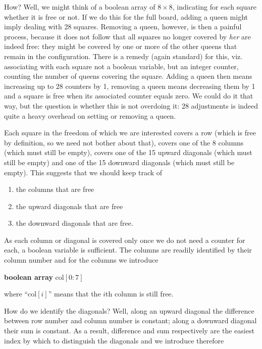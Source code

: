 \documentclass[twoside,11pt]{book}
\begin{document}
How? Well, we might think of a boolean array of $8\times 8$, indicating for each square whether it is free or not. If we do this for the full board, adding a queen might imply dealing with 28 squares. Removing a queen, however, is then a painful process, because it does not follow that all squares no longer covered by \textit{her} are indeed free: they might be covered by one or more of the other queens that remain in the configuration. There is a remedy (again standard) for this, viz. associating with each square not a boolean variable, but an integer counter, counting the number of queens covering the square. Adding a queen then means increasing up to 28 counters by 1, removing a queen means decreasing them by 1 and a square is free when its associated counter equals zero. We could do it that way, but the question is whether this is not overdoing it: 28 adjustments is indeed quite a heavy overhead on setting or removing a queen.

Each square in the freedom of which we are interested covers a row (which is free by definition, so we need not bother about that), covers one of the 8 columns (which must still be empty), covers one of the 15 upward diagonals (which must still be empty) and one of the 15 downward diagonals (which must still be empty). This suggests that we should keep track of

\begin{enumerate}[wide, nosep, label=(\arabic*)]
	\item the columns that are free
	\item the upward diagonals that are free
	\item the downward diagonals that are free.
\end{enumerate}

As each column or diagonal is covered only once we do not need a counter for each, a boolean variable is sufficient. The columns are readily identified by their column number and for the columns we introduce

\textbf{boolean array} col$[0:7]$

\noindent
where ``col$[i]$'' means that the $i$th column is still free.

How do we identify the diagonals? Well, along an upward diagonal the difference between row number and column number is constant; along a downward diagonal their sum is constant. As a result, difference and sum respectively are the easiest index by which to distinguish the diagonals and we introduce therefore
\end{document}
